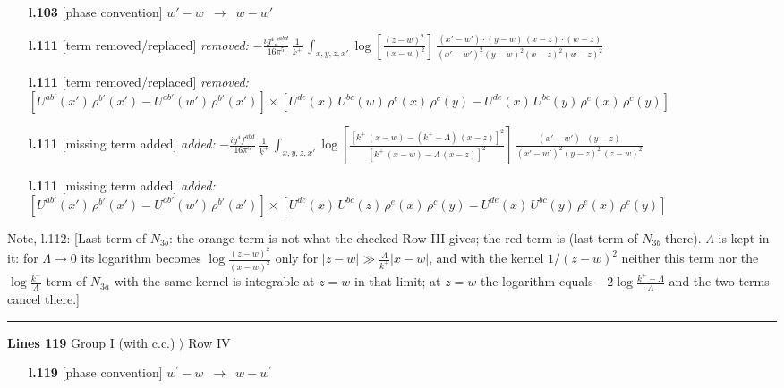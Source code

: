 \documentclass[10pt]{article}
\newenvironment{notebox}{\def\FrameCommand{{\color{notebar}\vrule width 1.5pt}\hspace{6pt}}\MakeFramed{\advance\hsize-\width\FrameRestore}\small}{\endMakeFramed}
\begin{document}
\begin{itemize}[leftmargin=2.2em,itemsep=1pt,topsep=2pt]
\item[\textbf{l.103}] \textsf{\small [phase convention]} $\displaystyle w'-w$\ $\longrightarrow$\ $\displaystyle w-w'$
\item[\textbf{l.111}] \textsf{\small [term removed/replaced]} \emph{removed:} $\displaystyle -\frac{ig^{4}f^{abd}}{16\pi^{5}}\,\frac{1}{k^{+}}\,\int_{x,y,z,x'}\log{[\frac{(z-w)^{2}}{(x-w)^{2}}]}\,\frac{(x'-w')\cdot(y-w)\, (x-z)\cdot (w-z)}{(x'-w')^{2}(y-w)^{2}(x-z)^{2}(w-z)^{2}}$
\item[\textbf{l.111}] \textsf{\small [term removed/replaced]} \emph{removed:} $\displaystyle [U^{ab'}(x')\,\rho^{b'}(x')-U^{ab'}(w')\, \rho^{b'}(x')]\times [U^{de}(x)\,U^{bc}(w)\, \rho^{e}(x)\,\rho^{c}(y)-U^{de}(x)\,U^{bc}(y)\,\rho^{e}(x)\,\rho^{c}(y)]$
\item[\textbf{l.111}] \textsf{\small [missing term added]} \emph{added:} $\displaystyle -\frac{ig^{4}f^{abd}}{16\pi^{5}}\,\frac{1}{k^{+}}\,\int_{x,y,z,x'}\log{[\frac{[k^{+}\,(x-w)-(k^{+}-\Lambda)\,(x-z)]^{2}}{[k^{+}\,(x-w)-\Lambda\,(x-z)]^{2}}]}\,\frac{(x'-w')\cdot(y-z)}{(x'-w')^{2}(y-z)^{2}\,(z-w)^{2}}$
\item[\textbf{l.111}] \textsf{\small [missing term added]} \emph{added:} $\displaystyle [U^{ab'}(x')\,\rho^{b'}(x')-U^{ab'}(w')\, \rho^{b'}(x')]\times [U^{de}(x)\,U^{bc}(z)\, \rho^{e}(x)\,\rho^{c}(y)-U^{de}(x)\,U^{bc}(y)\,\rho^{e}(x)\,\rho^{c}(y)]$
\end{itemize}
\begin{notebox}\textsf{\small Note, l.112:} [Last term of $N_{3b}$: the orange term is not what the checked Row III gives; the red term is (last term of $N_{3b}$ there). $\Lambda$ is kept in it: for $\Lambda\to0$ its logarithm becomes $\log\frac{(z-w)^{2}}{(x-w)^{2}}$ only for $|z-w|\gg\frac{\Lambda}{k^{+}}|x-w|$, and with the kernel $1/(z-w)^{2}$ neither this term nor the $\log\frac{k^{+}}{\Lambda}$ term of $N_{3a}$ with the same kernel is integrable at $z=w$ in that limit; at $z=w$ the logarithm equals $-2\log\frac{k^{+}-\Lambda}{\Lambda}$ and the two terms cancel there.]\end{notebox}
\noindent\rule{\linewidth}{0.3pt}\par\noindent\textbf{Lines 119} \quad \textsf{Group I (with c.c.) $\rangle$ Row IV} \par
\begin{itemize}[leftmargin=2.2em,itemsep=1pt,topsep=2pt]
\item[\textbf{l.119}] \textsf{\small [phase convention]} $\displaystyle w^\prime-w$\ $\longrightarrow$\ $\displaystyle w-w^\prime$
\end{itemize}
\end{document}

